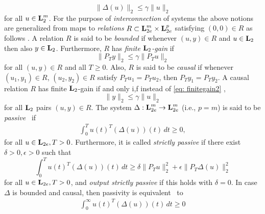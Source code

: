 \documentclass[11pt]{article}
\newcommand{\Ltwo}{\boldsymbol{\rm L}_{2}}
\newcommand{\Ltwoe}{\boldsymbol{\rm L}_{2e}}
\begin{document}
\begin{equation}\label{eq: finitegain1}
\|\Delta (u) \|_2 \leq \gamma  \| u\|_2
\end{equation}
for all $u \in \Ltwo^m$.  For the purpose of {\it interconnection} of systems the above notions are generalized from maps to {\it relations}
$R \subset \Ltwoe^m \times \Ltwoe^p$ satisfying $(0,0) \in R$ as follows \cite{Sch17}. A relation $R$ is said to be {\it bounded} if whenever
$(u,y)\in R$ and $u\in \Ltwo$ then also $y\in \Ltwo$. Furthermore, $R$ has {\it finite $\Ltwo$-gain} if
\begin{equation}\label{eq: finitegain2}
\| P_Ty\|_2 \leq \gamma  \| P_T u\|_2
\end{equation}
for all $(u,y) \in R$ and all $T\geq 0$. Also, $R$ is said to be {\it causal} if whenever $(u_1,y_1) \in R$, $(u_2,y_2)\in R$ satisfy $P_Tu_1=P_Tu_2$, then $P_Ty_1=P_Ty_2$. A causal relation $R$ has finite $\Ltwo$-gain if and only i,f instead of \eqref{eq: finitegain2} ,
\begin{equation}\label{eq: finitegain3}
\|y\|_2 \leq \gamma  \| u\|_2
\end{equation}
for all $\Ltwo$ pairs $(u,y) \in R$.
The system $\Delta:   \Ltwoe^m \to \Ltwoe^m$ (i.e., $p=m$) is said to be \emph{passive}~\cite{Wil72, Vid81} if
\begin{align} \label{eq: passive}
\int_0^T u(t)^T (\Delta (u))(t) \, dt \geq 0, 
\end{align}
for all $u \in \Ltwoe, T >0$. Furthermore, it is called \emph{strictly passive} if there exist $\delta>0, \epsilon > 0$ such that
\[
\int_0^T u(t)^T (\Delta (u))(t) \, dt \geq \delta \|P_T u\|_2^2 +  \epsilon \|P_T \Delta (u)\|_2^2
\]
for all $u \in \Ltwoe, T >0$, and \emph{output strictly passive} if this holds with $\delta=0$.
In case $\Delta$ is bounded and causal, then passivity is equivalent~\cite[Proposition 2.2.5]{Sch17} to
\begin{align} \label{eq: causal_passive}
\int_0^\infty u(t)^T (\Delta (u))(t) \, dt \geq 0
\end{align}
\end{document}
